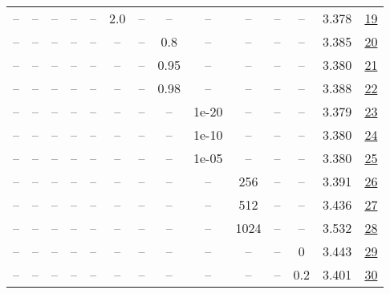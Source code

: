 \begin{table}[H]
\begin{tabular}{cccccccccccccc}
-- & -- & -- & -- & -- & 2.0 & -- & -- & -- & -- & -- & -- & 3.378 & \href{https://wandb.ai/stanford-mercury/optimizer-scaling/runs/sweep-130m-5B-scion319537lr0.016-wd0.1-minlr0-warmup0-b10.95-gn2-c45aff}{19} \\
-- & -- & -- & -- & -- & -- & -- & 0.8 & -- & -- & -- & -- & 3.385 & \href{https://wandb.ai/stanford-mercury/optimizer-scaling/runs/sweep-130m-5B-scionfaeeb3lr0.016-wd0.1-minlr0-warmup0-b10.95-gn1-d985d7}{20} \\
-- & -- & -- & -- & -- & -- & -- & 0.95 & -- & -- & -- & -- & 3.380 & \href{https://wandb.ai/stanford-mercury/optimizer-scaling/runs/sweep-130m-5B-scionc0fc35lr0.016-wd0.1-minlr0-warmup0-b10.95-gn1-70508b}{21} \\
-- & -- & -- & -- & -- & -- & -- & 0.98 & -- & -- & -- & -- & 3.388 & \href{https://wandb.ai/stanford-mercury/optimizer-scaling/runs/sweep-130m-5B-scion382771lr0.016-wd0.1-minlr0-warmup0-b10.95-gn1-cad6c0}{22} \\
-- & -- & -- & -- & -- & -- & -- & -- & 1e-20 & -- & -- & -- & 3.379 & \href{https://wandb.ai/stanford-mercury/optimizer-scaling/runs/sweep-130m-5B-scion98431elr0.016-wd0.1-minlr0-warmup0-b10.95-gn1-1be7a9}{23} \\
-- & -- & -- & -- & -- & -- & -- & -- & 1e-10 & -- & -- & -- & 3.380 & \href{https://wandb.ai/stanford-mercury/optimizer-scaling/runs/sweep-130m-5B-scione949f4lr0.016-wd0.1-minlr0-warmup0-b10.95-gn1-de429b}{24} \\
-- & -- & -- & -- & -- & -- & -- & -- & 1e-05 & -- & -- & -- & 3.380 & \href{https://wandb.ai/stanford-mercury/optimizer-scaling/runs/sweep-130m-5B-scion39d339lr0.016-wd0.1-minlr0-warmup0-b10.95-gn1-f7a7f0}{25} \\
-- & -- & -- & -- & -- & -- & -- & -- & -- & 256 & -- & -- & 3.391 & \href{https://wandb.ai/stanford-mercury/optimizer-scaling/runs/sweep-130m-5B-scion949b38lr0.016-wd0.1-minlr0-warmup0-b10.95-gn1-1d499a}{26} \\
-- & -- & -- & -- & -- & -- & -- & -- & -- & 512 & -- & -- & 3.436 & \href{https://wandb.ai/stanford-mercury/optimizer-scaling/runs/sweep-130m-5B-scion697cdelr0.016-wd0.1-minlr0-warmup0-b10.95-gn1-228b44}{27} \\
-- & -- & -- & -- & -- & -- & -- & -- & -- & 1024 & -- & -- & 3.532 & \href{https://wandb.ai/stanford-mercury/optimizer-scaling/runs/sweep-130m-5B-scion6ff86alr0.016-wd0.1-minlr0-warmup0-b10.95-gn1-31315c}{28} \\
-- & -- & -- & -- & -- & -- & -- & -- & -- & -- & -- & 0 & 3.443 & \href{https://wandb.ai/stanford-mercury/optimizer-scaling/runs/sweep-130m-5B-scion12ea16lr0.016-wd0-minlr0-warmup0-b10.95-gn1-s-98cd4d}{29} \\
-- & -- & -- & -- & -- & -- & -- & -- & -- & -- & -- & 0.2 & 3.401 & \href{https://wandb.ai/stanford-mercury/optimizer-scaling/runs/sweep-130m-5B-scion03a52blr0.016-wd0.2-minlr0-warmup0-b10.95-gn1-a7350e}{30} \\
\bottomrule
\end{tabular}
\end{table}

